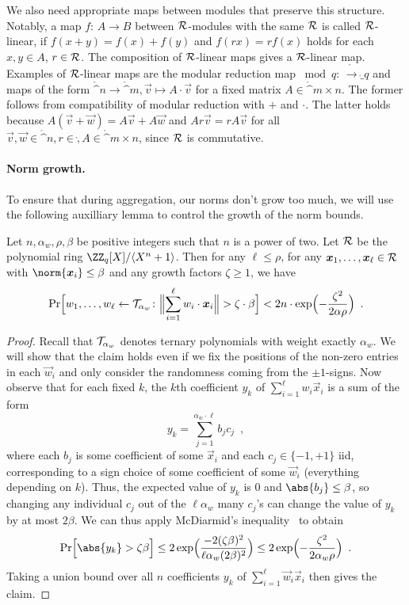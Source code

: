We also need appropriate maps between modules that preserve this structure. Notably, a map $f\colon\,A\to B$ between $\mathcal{R}$-modules with the same $\mathcal{R}$ is called $\mathcal{R}$-linear, if $f(x+y) = f(x) + f(y)$ and $f(rx) = rf(x)$ holds for each $x,y\in A$, $r\in\mathcal{R}$. The composition of $\mathcal{R}$-linear maps gives a $\mathcal{R}$-linear map.
Examples of $\mathcal{R}$-linear maps are the modular reduction map ${}\bmod q\colon\,\ring\to\ring_q$ and maps of the form $\ring^n \to \ring^m, \vec{v}\mapsto A\cdot \vec{v}$ for a fixed matrix $A\in\ring^{m\times n}$. The former follows from compatibility of modular reduction with $+$ and $\cdot$. The latter holds because $A(\vec{v}+\vec{w}) = A\vec{v} + A\vec{w}$ and $Ar\vec{v} = rA\vec{v}$ for all $\vec{v},\vec{w}\in\ring^n, r\in \ring, A\in\ring^{m\times n}$, since $\mathcal{R}$ is commutative.

\paragraph{Norm growth.}
To ensure that during aggregation, our norms don't grow too much, we will use the following auxilliary lemma to control the growth of the norm bounds.
\begin{lemma}\label{lem:normgrowth}
Let $n, \alpha_w, \rho, \beta$ be positive integers such that $n$ is a power of two.
Let $\mathcal{R}$ be the polynomial ring $\defringq$.
Then for any $\ell\leq \rho$, for any $\boldsymbol{x}_1,\ldots,\boldsymbol{x}_\ell\in \mathcal{R}$ with $\norm{\vec{x}_i}\leq \beta$ and any growth factors $\zeta \geq 1$, we have
\[
 \Pr\Bigl[w_1,\ldots,w_\ell \gets \tern_{\alpha_w}\colon \Bigl\|\smashoperator{\sum_{i=1}^{\ell}} w_i\cdot \vec{x}_i\Bigr\| > \zeta\cdot \beta \Bigr] < 2n\cdot \exp\Bigl(-\frac{\zeta^2}{2\alpha\rho}\Bigr)\enspace.
\]
\end{lemma}
\begin{proof}
Recall that $\mathcal{T}_{\alpha_w}$ denotes ternary polynomials with weight exactly $\alpha_w$. We will show that the claim holds even if we fix the positions of the non-zero entries in each $\vec{w}_i$ and only consider the randomness coming from the $\pm 1$-signs.
Now observe that for each fixed $k$, the $k$th coefficient $y_k$ of $\sum_{i=1}^{\ell} w_i \vec{x}_i$ is a sum of the form
\[
 y_k = \sum_{j=1}^{\alpha_w\cdot \ell} b_j c_j\enspace,
\]
where each $b_j$ is some coefficient of some $\vec{x}_i$ and each $c_j\in\{-1,+1\}$ iid, corresponding to a sign choice of some coefficient of some $\vec{w}_i$ (everything depending on $k$).
Thus, the expected value of $y_k$ is 0 and $\abs{b_j}\leq \beta$, so changing any individual $c_j$ out of the $\ell\alpha_w$ many $c_j$'s can change the value of $y_k$ by at most $2\beta$.
We can thus apply McDiarmid's inequality~\cite{McDiarmid89} to obtain
\[
 \Pr\Bigl[\abs{y_k} > \zeta\beta\Bigr] \leq 2\exp\Bigl(\frac{-2(\zeta\beta)^2}{\ell\alpha_w(2\beta)^2}\Bigr) \leq 2\exp\Bigl(- \frac{\zeta^2}{2\alpha_w\rho} \Bigr)\enspace.
\]
Taking a union bound over all $n$ coefficients $y_k$ of $\sum_{i=1}^{\ell} \vec{w}_i \vec{x}_i$ then gives the claim.
\end{proof}

